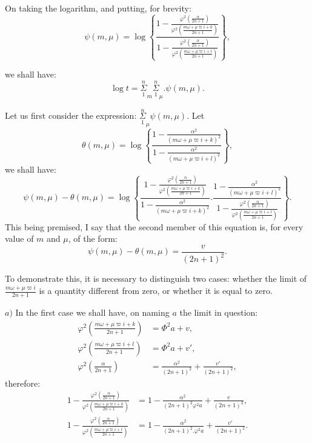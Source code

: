 \documentclass{article}
\begin{document}
On taking the logarithm, and putting, for brevity:
\[ \psi(m,\mu)=\log\left\{\frac{1-\frac{\varphi^{2}\left(\frac{\alpha}{2n+1}\right)}{\varphi^{2}\left(\frac{m\omega+\mu\varpi i+k}{2n+1}\right)}}{1-\frac{\varphi^{2}\left(\frac{\alpha}{2n+1}\right)}{\varphi^{2}\left(\frac{m\omega+\mu\varpi i+l}{2n+1}\right)}}\right\}, \tag{164.} \]

we shall have:
\[ \log t=\overset{n}{\underset{1}{\Sigma}}_{m}\overset{n}{\underset{1}{\Sigma}}_{\mu}.\psi(m,\mu). \tag{165.} \]

Let us first consider the expression: $\overset{n}{\underset{1}{\Sigma}}_{\mu}\psi(m,\mu)$. Let
\[ \theta(m,\mu)=\log\left\{\frac{1-\frac{\alpha^{2}}{(m\omega+\mu\varpi i+k)^{2}}}{1-\frac{\alpha^{2}}{(m\omega+\mu\varpi i+l)^{2}}}\right\}, \tag{166.} \]
we shall have:
\[ \psi(m,\mu)-\theta(m,\mu)=\log\left\{\frac{1-\frac{\varphi^{2}\left(\frac{\alpha}{2n+1}\right)}{\varphi^{2}\left(\frac{m\omega+\mu\varpi i+k}{2n+1}\right)}}{1-\frac{\alpha^{2}}{(m\omega+\mu\varpi i+k)^{2}}}.\frac{1-\frac{\alpha^{2}}{(m\omega+\mu\varpi i+l)^{2}}}{1-\frac{\varphi^{2}\left(\frac{\alpha}{2n+1}\right)}{\varphi^{2}\left(\frac{m\omega+\mu\varpi i+l}{2n+1}\right)}}\right\}. \]
This being premised, I say that the second member of this equation is, for every value of $m$ and $\mu$, of the form:
\[ \psi(m,\mu)-\theta(m,\mu)=\frac{v}{(2n+1)^{2}}. \]

To demonstrate this, it is necessary to distinguish two cases: whether the limit of $\frac{m\omega+\mu\varpi i}{2n+1}$ is a quantity different from zero, or whether it is equal to zero.

$a)$ In the first case we shall have, on naming $a$ the limit in question:
\[ \begin{aligned}\varphi^{2}\left(\frac{m\omega+\mu\varpi i+k}{2n+1}\right)&=\Phi^{2}a+v,\\ \varphi^{2}\left(\frac{m\omega+\mu\varpi i+l}{2n+1}\right)&=\Phi^{2}a+v',\\ \varphi^{2}\left(\frac{\alpha}{2n+1}\right)&=\frac{\alpha^{2}}{(2n+1)^{2}}+\frac{v'}{(2n+1)^{2}},\end{aligned} \]
therefore:
\[ \begin{aligned}1-\frac{\varphi^{2}\left(\frac{\alpha}{2n+1}\right)}{\varphi^{2}\left(\frac{m\omega+\mu\varpi i+k}{2n+1}\right)}&=1-\frac{\alpha^{2}}{(2n+1)^{2}\varphi^{2}a}+\frac{v}{(2n+1)^{2}},\\ 1-\frac{\varphi^{2}\left(\frac{\alpha}{2n+1}\right)}{\varphi^{2}\left(\frac{m\omega+\mu\varpi i+l}{2n+1}\right)}&=1-\frac{\alpha^{2}}{(2n+1)^{2}.\varphi^{2}a}+\frac{v'}{(2n+1)^{2}}.\end{aligned} \]
\end{document}

